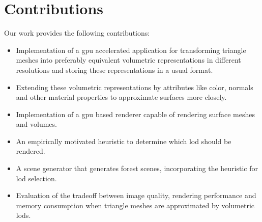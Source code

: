 \section{Contributions}
Our work provides the following contributions:
\begin{itemize}
    \item Implementation of a \ac{gpu} accelerated application for transforming triangle meshes into preferably equivalent volumetric representations in different resolutions and storing these representations in a usual format.
    \item Extending these volumetric representations by attributes like color, normals and other material properties to approximate surfaces more closely.
    \item Implementation of a \ac{gpu} based renderer capable of rendering surface meshes and volumes.
    \item An empirically motivated heuristic to determine which \ac{lod} should be rendered.
    \item A scene generator that generates forest scenes, incorporating the heuristic for \ac{lod} selection.
    \item Evaluation of the tradeoff between image quality, rendering performance and memory consumption when triangle meshes are approximated by volumetric \acsp{lod}.
\end{itemize}
